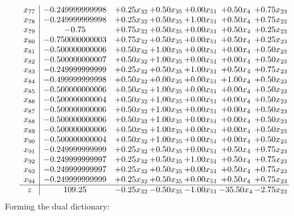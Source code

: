 \documentclass[8pt]{article}
\begin{document}
\[\begin{array}{c| c c@{\hskip 2pt} c@{\hskip 2pt} c@{\hskip 2pt} c@{\hskip 2pt} c@{\hskip 2pt} }
 x_{77}   &  -0.249999999998 & +  0.25 x_{32} & +  0.50 x_{35} & +  0.00 x_{51} & +  0.50 x_{4} & +  0.75 x_{23}\\
 x_{78}   &  -0.249999999998 & +  0.25 x_{32} & +  0.50 x_{35} & +  1.00 x_{51} & +  0.50 x_{4} & +  0.75 x_{23}\\
 x_{79}   &  -0.75 & +  0.75 x_{32} & +  0.50 x_{35} & +  0.00 x_{51} & +  0.50 x_{4} & +  0.25 x_{23}\\
 x_{80}   &  -0.750000000003 & +  0.75 x_{32} & +  0.50 x_{35} & +  0.00 x_{51} & +  0.50 x_{4} & +  0.25 x_{23}\\
 x_{81}   &  -0.500000000006 & +  0.50 x_{32} & +  1.00 x_{35} & +  0.00 x_{51} & +  0.00 x_{4} & +  0.50 x_{23}\\
 x_{82}   &  -0.500000000007 & +  0.50 x_{32} & +  1.00 x_{35} & +  0.00 x_{51} & +  0.00 x_{4} & +  0.50 x_{23}\\
 x_{83}   &  -0.249999999999 & +  0.25 x_{32} & +  0.50 x_{35} & +  1.00 x_{51} & +  0.50 x_{4} & +  0.75 x_{23}\\
 x_{84}   &  -0.499999999998 & +  0.50 x_{32} & +  0.00 x_{35} & +  0.00 x_{51} & +  1.00 x_{4} & +  0.50 x_{23}\\
 x_{85}   &  -0.500000000006 & +  0.50 x_{32} & +  1.00 x_{35} & +  0.00 x_{51} & +  0.00 x_{4} & +  0.50 x_{23}\\
 x_{86}   &  -0.500000000004 & +  0.50 x_{32} & +  1.00 x_{35} & +  0.00 x_{51} & +  0.00 x_{4} & +  0.50 x_{23}\\
 x_{87}   &  -0.500000000006 & +  0.50 x_{32} & +  1.00 x_{35} & +  0.00 x_{51} & +  0.00 x_{4} & +  0.50 x_{23}\\
 x_{88}   &  -0.500000000006 & +  0.50 x_{32} & +  1.00 x_{35} & +  0.00 x_{51} & +  0.00 x_{4} & +  0.50 x_{23}\\
 x_{89}   &  -0.500000000006 & +  0.50 x_{32} & +  1.00 x_{35} & +  0.00 x_{51} & +  0.00 x_{4} & +  0.50 x_{23}\\
 x_{90}   &  -0.500000000004 & +  0.50 x_{32} & +  1.00 x_{35} & +  0.00 x_{51} & +  0.00 x_{4} & +  0.50 x_{23}\\
 x_{91}   &  -0.249999999999 & +  0.25 x_{32} & +  0.50 x_{35} & +  0.00 x_{51} & +  0.50 x_{4} & +  0.75 x_{23}\\
 x_{92}   &  -0.249999999997 & +  0.25 x_{32} & +  0.50 x_{35} & +  1.00 x_{51} & +  0.50 x_{4} & +  0.75 x_{23}\\
 x_{93}   &  -0.249999999997 & +  0.25 x_{32} & +  0.50 x_{35} & +  0.00 x_{51} & +  0.50 x_{4} & +  0.75 x_{23}\\
 x_{94}   &  -0.249999999999 & +  0.25 x_{32} & +  0.50 x_{35} & +  0.00 x_{51} & +  0.50 x_{4} & +  0.75 x_{23}\\
\hline
z    &  109.25 & -0.25 x_{32} & -0.50 x_{35} & -1.00 x_{51} & -35.50 x_{4} & -2.75 x_{23}\\
\end{array}\]
Forming the dual dictionary:
\end{document}

